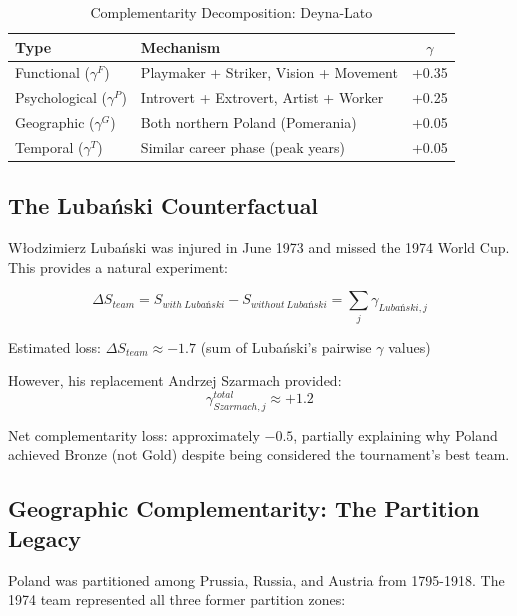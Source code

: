 \begin{table}[h]
\centering
\caption{Complementarity Decomposition: Deyna-Lato}
\label{tab:deyna-lato}
\begin{tabular}{llc}
\toprule
\textbf{Type} & \textbf{Mechanism} & \textbf{$\gamma$} \\
\midrule
Functional ($\gamma^{F}$) & Playmaker + Striker, Vision + Movement & +0.35 \\
Psychological ($\gamma^{P}$) & Introvert + Extrovert, Artist + Worker & +0.25 \\
Geographic ($\gamma^{G}$) & Both northern Poland (Pomerania) & +0.05 \\
Temporal ($\gamma^{T}$) & Similar career phase (peak years) & +0.05 \\
\bottomrule
\end{tabular}
\end{table}

\subsection{The Lubański Counterfactual}

Włodzimierz Lubański was injured in June 1973 and missed the 1974 World Cup.
This provides a natural experiment:

\begin{equation}
\Delta S_{team} = S_{with\ Lubański} - S_{without\ Lubański} = \sum_{j} \gamma_{Lubański,j}
\end{equation}

Estimated loss: $\Delta S_{team} \approx -1.7$ (sum of Lubański's pairwise $\gamma$ values)

However, his replacement Andrzej Szarmach provided:
\begin{equation}
\gamma_{Szarmach,j}^{total} \approx +1.2
\end{equation}

Net complementarity loss: approximately $-0.5$, partially explaining why Poland
achieved Bronze (not Gold) despite being considered the tournament's best team.

\subsection{Geographic Complementarity: The Partition Legacy}

Poland was partitioned among Prussia, Russia, and Austria from 1795-1918.
The 1974 team represented all three former partition zones:

